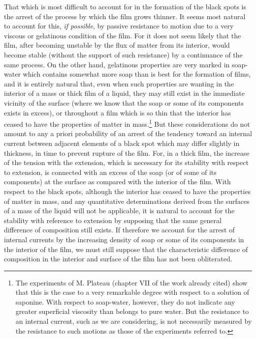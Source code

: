 \documentclass[12pt]{article}
\begin{document}
That which is most difficult to account for in the formation of the black spots is the arrest of the process by which the film grows thinner. It seems most natural to account for this, \textit{if possible}, by passive resistance to motion due to a very viscous or gelatinous condition of the film. For it does not seem likely that the film, after becoming unstable by the flux of matter from its interior, would become stable (without the support of such resistance) by a continuance of the same process. On the other hand, gelatinous properties are very marked in soap-water which contains somewhat more soap than is best for the formation of films, and it is entirely natural that, even when such properties are wanting in the interior of a mass or thick film of a liquid, they may still exist in the immediate vicinity of the surface (where we know that the soap or some of its components exists in excess), or throughout a film which is so thin that the interior has ceased to have the properties of matter in mass.\footnote{The experiments of M. Plateau (chapter VII of the work already cited) show that this is the case to a very remarkable degree with respect to a solution of saponine. With respect to soap-water, however, they do not indicate any greater superficial viscosity than belongs to pure water. But the resistance to an internal current, such as we are considering, is not necessarily measured by the resistance to such motions as those of the experiments referred to.} But these considerations do not amount to any a priori probability of an arrest of the tendency toward an internal current between adjacent elements of a black spot which may differ slightly in thickness, in time to prevent rupture of the film. For, in a thick film, the increase of the tension with the extension, which is necessary for its stability with respect to extension, is connected with an excess of the soap (or of some of its components) at the surface as compared with the interior of the film. With respect to the black spots, although the interior has ceased to have the properties of matter in mass, and any quantitative determinations derived from the surfaces of a mass of the liquid will not be applicable, it is natural to account for the stability with reference to extension by supposing that the same general difference of composition still exists. If therefore we account for the arrest of internal currents by the increasing density of soap or some of its components in the interior of the film, we must still suppose that the characteristic difference of composition in the interior and surface of the film has not been obliterated.
\end{document}

